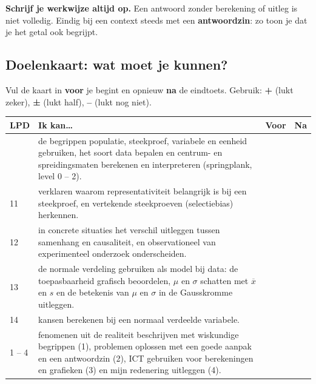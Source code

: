 \begin{letop}
\textbf{Schrijf je werkwijze altijd op.} Een antwoord zonder berekening of uitleg is niet volledig. Eindig bij een context steeds met een \textbf{antwoordzin}: zo toon je dat je het getal ook begrijpt.
\end{letop}

\pagina

\subsection*{Doelenkaart: wat moet je kunnen?}

Vul de kaart in \textbf{voor} je begint en opnieuw \textbf{na} de eindtoets. Gebruik: \textbf{+} (lukt zeker), \textbf{±} (lukt half), \textbf{–} (lukt nog niet).

\begin{tabular}{llll}
\hline
LPD & Ik kan… & Voor & Na \\
\hline
 & de begrippen populatie, steekproef, variabele en eenheid gebruiken, het soort data bepalen en centrum- en spreidingsmaten berekenen en interpreteren (springplank, level 0 – 2). & & \\
11 & verklaren waarom representativiteit belangrijk is bij een steekproef, en vertekende steekproeven (selectiebias) herkennen. & & \\
12 & in concrete situaties het verschil uitleggen tussen samenhang en causaliteit, en observationeel van experimenteel onderzoek onderscheiden. & & \\
13 & de normale verdeling gebruiken als model bij data: de toepasbaarheid grafisch beoordelen, $\mu$ en $\sigma$ schatten met $\overline{x}$ en $s$ en de betekenis van $\mu$ en $\sigma$ in de Gausskromme uitleggen. & & \\
14 & kansen berekenen bij een normaal verdeelde variabele. & & \\
1 – 4 & fenomenen uit de realiteit beschrijven met wiskundige begrippen (1), problemen oplossen met een goede aanpak en een antwoordzin (2), ICT gebruiken voor berekeningen en grafieken (3) en mijn redenering uitleggen (4). & & \\
\hline
\end{tabular}
